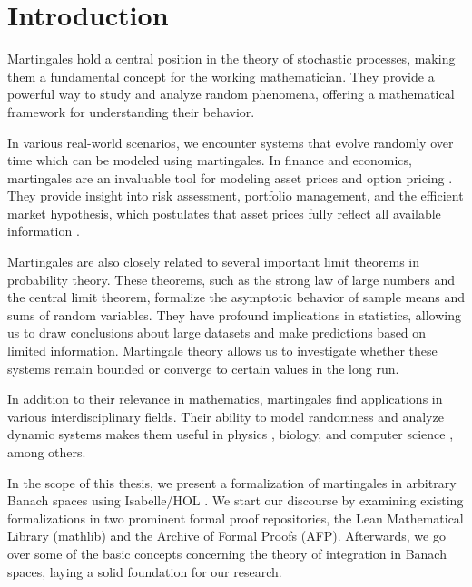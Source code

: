 ﻿%

\chapter{Introduction}\label{chapter:introduction}

Martingales hold a central position in the theory of stochastic processes, making them a fundamental concept for the working mathematician. They provide a powerful way to study and analyze random phenomena, offering a mathematical framework for understanding their behavior. 

In various real-world scenarios, we encounter systems that evolve randomly over time which can be modeled using martingales. In finance and economics, martingales are an invaluable tool for modeling asset prices \cite{fama1965} and option pricing \cite{Musiela_Rutkowski_2005}. They provide insight into risk assessment, portfolio management, and the efficient market hypothesis, which postulates that asset prices fully reflect all available information \cite{yaes1989}. 

Martingales are also closely related to several important limit theorems in probability theory. These theorems, such as the strong law of large numbers and the central limit theorem, formalize the asymptotic behavior of sample means and sums of random variables. They have profound implications in statistics, allowing us to draw conclusions about large datasets and make predictions based on limited information. Martingale theory allows us to investigate whether these systems remain bounded or converge to certain values in the long run.

In addition to their relevance in mathematics, martingales find applications in various interdisciplinary fields. Their ability to model randomness and analyze dynamic systems makes them useful in physics \cite{roldan2023}, biology, and computer science \cite{mitzenmacher_upfal_2005}, among others.

In the scope of this thesis, we present a formalization of martingales in arbitrary Banach spaces using Isabelle/HOL \cite{Keskin_A_Formalization_of_2023}. We start our discourse by examining existing formalizations in two prominent formal proof repositories, the Lean Mathematical Library (\textsf{mathlib}) and the Archive of Formal Proofs (\textsf{AFP}). Afterwards, we go over some of the basic concepts concerning the theory of integration in Banach spaces, laying a solid foundation for our research.

